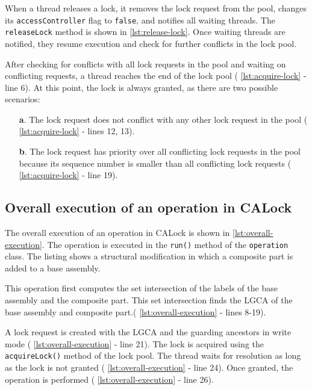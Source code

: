 When a thread releases a lock, it removes the lock request from the pool, changes its \texttt{accessController} flag to \texttt{false}, and notifies all waiting threads. The \texttt{releaseLock} method is shown in  \cref{lst:release-lock}. Once waiting threads are notified, they resume execution and check for further conflicts in the lock pool.


After checking for conflicts with all lock requests in the pool and waiting on conflicting requests, a thread reaches the end of the lock pool ( \cref{lst:acquire-lock} - line 6). At this point, the lock is always granted, as there are two possible scenarios:

\begin{enumerate}
    \item[\textbf{a}.] The lock request does not conflict with any other lock request in the pool ( \cref{lst:acquire-lock} - lines 12, 13).
    \item[\textbf{b}.] The lock request has priority over all conflicting lock requests in the pool because its sequence number is smaller than all conflicting lock requests ( \cref{lst:acquire-lock} - line 19). 
\end{enumerate}



\subsection{Overall execution of an operation in CALock}

The overall execution of an operation in CALock is shown in  \cref{lst:overall-execution}. The operation is executed in the \texttt{run()} method of the \texttt{operation} class. The listing shows a structural modification in which a composite part is added to a base assembly.

This operation first computes the set intersection of the labels of the base assembly and the composite part. This set intersection finds the LGCA of the base assembly and composite part.( \cref{lst:overall-execution} - lines 8-19).

A lock request is created with the LGCA and the guarding ancestors in write mode ( \cref{lst:overall-execution} - line 21). The lock is acquired using the \texttt{acquireLock()} method of the lock pool. The thread waits for resolution as long as the lock is not granted ( \cref{lst:overall-execution} - line 24). Once granted, the operation is performed ( \cref{lst:overall-execution} - line 26).

